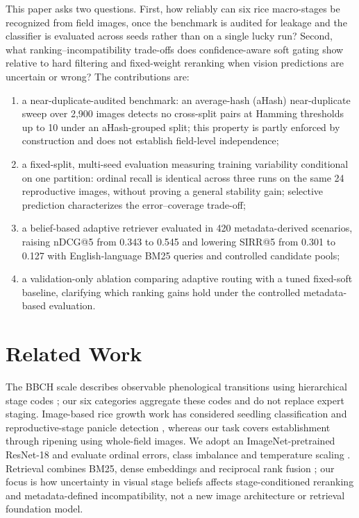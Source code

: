 \documentclass[conference,a4paper]{IEEEtran}
\begin{document}
This paper asks two questions. First, how reliably can six rice macro-stages be recognized from field images, once the benchmark is audited for leakage and the classifier is evaluated across seeds rather than on a single lucky run? Second, what ranking--incompatibility trade-offs does confidence-aware soft gating show relative to hard filtering and fixed-weight reranking when vision predictions are uncertain or wrong? The contributions are:
\begin{enumerate}
    \item a near-duplicate-audited benchmark: an average-hash (aHash) near-duplicate sweep over 2{,}900 images detects no cross-split pairs at Hamming thresholds up to 10 under an aHash-grouped split; this property is partly enforced by construction and does not establish field-level independence;
    \item a fixed-split, multi-seed evaluation measuring training variability conditional on one partition: ordinal recall is identical across three runs on the same 24 reproductive images, without proving a general stability gain; selective prediction characterizes the error--coverage trade-off;
    \item a belief-based adaptive retriever evaluated in 420 metadata-derived scenarios, raising nDCG@5 from 0.343 to 0.545 and lowering SIRR@5 from 0.301 to 0.127 with English-language BM25 queries and controlled candidate pools;
    \item a validation-only ablation comparing adaptive routing with a tuned fixed-soft baseline, clarifying which ranking gains hold under the controlled metadata-based evaluation.
\end{enumerate}

\section{Related Work}
The BBCH scale describes observable phenological transitions using hierarchical stage codes \cite{meier2001bbch,lancashire1991uniform}; our six categories aggregate these codes and do not replace expert staging. Image-based rice growth work has considered seedling classification and reproductive-stage panicle detection \cite{tan2022machine,tan2023ricepanicle,zheng2025android}, whereas our task covers establishment through ripening using whole-field images. We adopt an ImageNet-pretrained ResNet-18 \cite{he2016deep,deng2009imagenet} and evaluate ordinal errors, class imbalance and temperature scaling \cite{gutierrez2016ordinal,lin2017focal,guo2017calibration}. Retrieval combines BM25, dense embeddings and reciprocal rank fusion \cite{robertson2009bm25,karpukhin2020dpr,cormack2009rrf}; our focus is how uncertainty in visual stage beliefs affects stage-conditioned reranking and metadata-defined incompatibility, not a new image architecture or retrieval foundation model.
\end{document}
